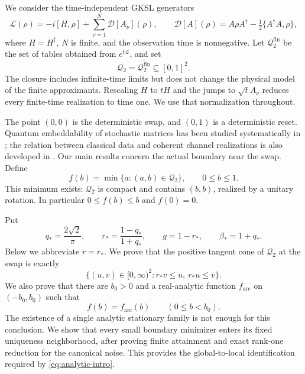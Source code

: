 \documentclass[11pt]{article}
\theoremstyle{definition}
\theoremstyle{remark}
\newcommand{\Q}{\mathcal Q_2}
\newcommand{\Diss}{\mathcal D}
\begin{document}
We consider the time-independent GKSL generators \cite{GKS1976,Lindblad1976}
\begin{equation}\label{eq:gksl}
 \mathcal L(\rho)=-i[H,\rho]+\sum_{\nu=1}^N\Diss[A_\nu](\rho),\qquad
 \Diss[A](\rho)=A\rho A^\dagger-\tfrac12\{A^\dagger A,\rho\},
\end{equation}
where \(H=H^\dagger\), \(N\) is finite, and the observation time is nonnegative. Let \(\mathcal Q_2^{\mathrm{fin}}\) be the set of tables obtained from \(e^{t\mathcal L}\), and set
\begin{equation}\label{eq:Qdefinition}
 \Q=\overline{\mathcal Q_2^{\mathrm{fin}}}\subseteq[0,1]^2.
\end{equation}
The closure includes infinite-time limits but does not change the physical model of the finite approximants. Rescaling \(H\) to \(tH\) and the jumps to \(\sqrt t A_\nu\) reduces every finite-time realization to time one. We use that normalization throughout.

The point \((0,0)\) is the deterministic swap, and \((0,1)\) is a deterministic reset. Quantum embeddability of stochastic matrices has been studied systematically in \cite{Shahbeigi2024}; the relation between classical data and coherent channel realizations is also developed in \cite{Korzekwa2018}. Our main results concern the actual boundary near the swap. Define
\begin{equation}\label{eq:fdefinition}
 f(b)=\min\{a:(a,b)\in\Q\},\qquad 0\leq b\leq1.
\end{equation}
This minimum exists: \(\Q\) is compact and contains \((b,b)\), realized by a unitary rotation. In particular \(0\leq f(b)\leq b\) and \(f(0)=0\).

Put
\begin{equation}\label{eq:constants}
 q_*=\frac{2\sqrt2}{\pi},\qquad
 r_*=\frac{1-q_*}{1+q_*},\qquad
 g=1-r_*,\qquad \beta_*=1+q_*.
\end{equation}
Below we abbreviate \(r=r_*\). We prove that the positive tangent cone of \(\Q\) at the swap is exactly
\begin{equation}\label{eq:cone-intro}
 \{(u,v)\in[0,\infty)^2:r_*v\leq u,\ r_*u\leq v\}.
\end{equation}
We also prove that there are \(b_0>0\) and a real-analytic function \(f_{\mathrm{arc}}\) on \((-b_0,b_0)\) such that
\begin{equation}\label{eq:analytic-intro}
 f(b)=f_{\mathrm{arc}}(b)\qquad(0\leq b<b_0).
\end{equation}
The existence of a single analytic stationary family is not enough for this conclusion. We show that every small boundary minimizer enters its fixed uniqueness neighborhood, after proving finite attainment and exact rank-one reduction for the canonical noise. This provides the global-to-local identification required by \eqref{eq:analytic-intro}.
\end{document}
